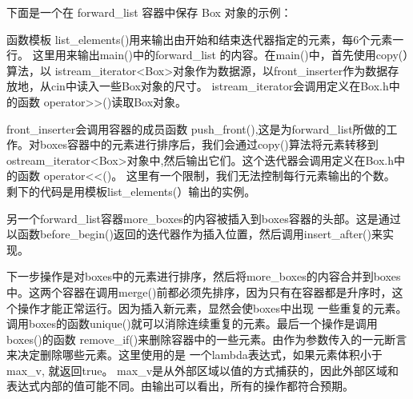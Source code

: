 下面是一个在 forward\_list 容器中保存 Box 对象的示例：


函数模板 list\_elements()用来输出由开始和结束迭代器指定的元素，每6个元素一行。
这里用来输出main()中的forward\_list 的内容。在main()中，首先使用copy(）算法，以 istream\_iterator<Box>对象作为数据源，以front\_inserter作为数据存放地，从cin中读入一些Box对象的尺寸。 istream\_iterator会调用定义在Box.h中的函数 operator>>()读取Box对象。


front\_inserter会调用容器的成员函数 push\_front(),这是为forward\_list所做的工作。对boxes容器中的元素进行排序后，我们会通过copy()算法将元素转移到ostream\_iterator<Box>对象中,然后输出它们。这个迭代器会调用定义在Box.h中的函数 operator<<()。 这里有一个限制，我们无法控制每行元素输出的个数。
剩下的代码是用模板list\_elements(）输出的实例。

另一个forward\_list容器more\_boxes的内容被插入到boxes容器的头部。这是通过以函数before\_begin()返回的迭代器作为插入位置，然后调用insert\_after()来实现。

下一步操作是对boxes中的元素进行排序，然后将more\_boxes的内容合并到boxes中。这两个容器在调用merge()前都必须先排序，因为只有在容器都是升序时，这个操作才能正常运行。因为插入新元素，显然会使boxes中出现 一些重复的元素。调用boxes的函数unique()就可以消除连续重复的元素。最后一个操作是调用boxes()的函数 remove\_if()来删除容器中的一些元素。由作为参数传入的一元断言来决定删除哪些元素。这里使用的是
一个lambda表达式，如果元素体积小于max\_v, 就返回true。 max\_v是从外部区域以值的方式捕获的，因此外部区域和表达式内部的值可能不同。由输出可以看出，所有的操作都符合预期。
